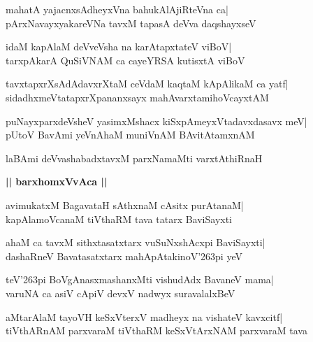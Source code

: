 \documentclass[twoside,12pt,openright]{book}
\def\S{\char'263}
\newcounter{shloka}[chapter]
\def\uvaca#1{\centerline{{\large\textbf{#1}}}}
\begin{document}
\begin{shloka}%
mahatA yajacnxsAdheyxVna bahukAlAjiRteVna ca|\\
pArxNavayxyakareVNa tavxM tapasA deVva daqshayxseV
\end{shloka}

\begin{shloka}%
idaM kapAlaM deVveVsha na karAtapxtateV viBoV|\\
tarxpAkarA QuSiVNAM ca cayeYRSA kutisxtA viBoV
\end{shloka}

\begin{shloka}%
tavxtapxrXsAdAdavxrXtaM ceVdaM kaqtaM kApAlikaM ca yatf|\\
sidadhxmeVtatapxrXpananxsayx mahAvarxtamihoVcayxtAM
\end{shloka}

\begin{shloka}%
puNayxparxdeVsheV yasimxMshacx kiSxpAmeyxVtadavxdasavx meV|\\
pUtoV BavAmi yeVnAhaM muniVnAM BAvitAtamxnAM
\end{shloka}

\begin{shloka}%
laBAmi deVvashabadxtavxM parxNamaMti varxtAthiRnaH
\end{shloka}

\uvaca{|| barxhomxVvAca ||}
\begin{shloka}%
avimukatxM BagavataH sAthxnaM cAsitx purAtanaM|\\
kapAlamoVcanaM tiVthaRM tava tatarx BaviSayxti
\end{shloka}

\begin{shloka}%
ahaM ca tavxM sithxtasatxtarx vuSuNxshAcxpi BaviSayxti|\\
dashaRneV Bavatasatxtarx mahApAtakinoV\S pi yeV
\end{shloka}

\begin{shloka}%
teV\S pi BoVgAnasxmashanxMti vishudAdx BavaneV mama|\\
varuNA ca asiV cApiV devxV nadwyx suravalalxBeV
\end{shloka}

\begin{shloka}%
aMtarAlaM tayoVH keSxVterxV madheyx na vishateV kavxcitf|\\
tiVthARnAM parxvaraM tiVthaRM keSxVtArxNAM parxvaraM tava
\end{shloka}
\end{document}
